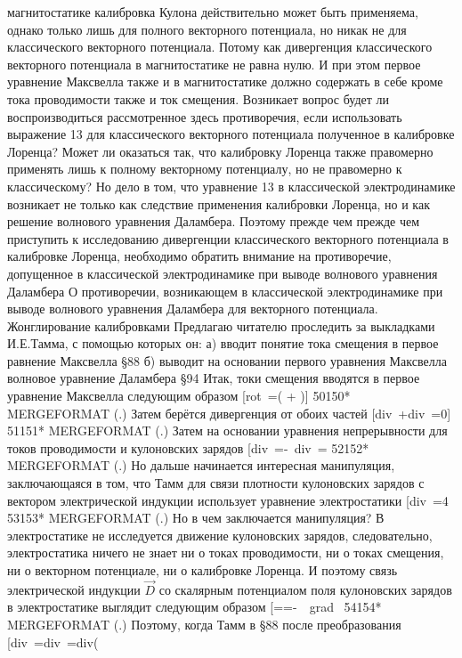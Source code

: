 \documentclass[11pt]{article}
\begin{document}
магнитостатике калибровка Кулона действительно может быть применяема,
однако только лишь для полного векторного потенциала, но никак не для
классического векторного потенциала. Потому как дивергенция
классического векторного потенциала в магнитостатике не равна нулю. И
при этом первое уравнение Максвелла также и в магнитостатике должно
содержать в себе кроме тока проводимости также и ток смещения. Возникает
вопрос будет ли воспроизводиться рассмотренное здесь противоречия, если
использовать выражение 13 для классического векторного потенциала
полученное в калибровке Лоренца? Может ли оказаться так, что калибровку
Лоренца также правомерно применять лишь к полному векторному потенциалу,
но не правомерно к классическому? Но дело в том, что уравнение 13 в
классической электродинамике возникает не только как следствие
применения калибровки Лоренца, но и как решение волнового уравнения
Даламбера. Поэтому прежде чем прежде чем приступить к исследованию
дивергенции классического векторного потенциала в калибровке Лоренца,
необходимо обратить внимание на противоречие, допущенное в классической
электродинамике при выводе волнового уравнения Даламбера О противоречии,
возникающем в классической электродинамике при выводе волнового
уравнения Даламбера для векторного потенциала. Жонглирование
калибровками Предлагаю читателю проследить за выкладками И.Е.Тамма, с
помощью которых он: а) вводит понятие тока смещения в первое равнение
Максвелла §88 б) выводит на основании первого уравнения Максвелла
волновое уравнение Даламбера §94 Итак, токи смещения вводятся в первое
уравнение Максвелла следующим образом
{[}rot~=\left(
+{{}\emph{{}} \right){]}
50150* MERGEFORMAT (.) Затем берётся дивергенция от обоих частей
{[}div~+div~{{}}{}}=0{]}
51151* MERGEFORMAT (.) Затем на основании уравнения непрерывности для
токов проводимости и кулоновских зарядов
{[}div~{{}\emph{{}}=-~div~=\frac{\partial \rho }{\partial t}{]}
52152* MERGEFORMAT (.) Но дальше начинается интересная манипуляция,
заключающаяся в том, что Тамм для связи плотности кулоновских зарядов с
вектором электрической индукции использует уравнение электростатики
{[}div~=4\pi \rho {]} 53153* MERGEFORMAT (.) Но в чем
заключается манипуляция? В электростатике не исследуется движение
кулоновских зарядов, следовательно, электростатика ничего не знает ни о
токах проводимости, ни о токах смещения, ни о векторном потенциале, ни о
калибровке Лоренца. И поэтому связь электрической индукции
\(\overrightarrow{D}\) со скалярным потенциалом поля кулоновских зарядов
в электростатике выглядит следующим образом
{[}=\varepsilon {}=-~\varepsilon ~grad~\varphi {]}
54154* MERGEFORMAT (.) Поэтому, когда Тамм в §88 после преобразования
{[}div~{{}}{}}=div~=div\left(
\end{document}
